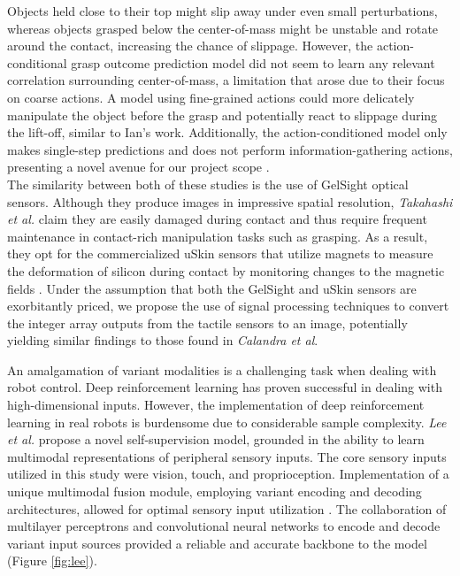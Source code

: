 \documentclass[11.5pt]{article}
\begin{document}
Objects held close to their top might slip away under even small perturbations, whereas objects grasped below the center-of-mass might be unstable and rotate around the contact, increasing the chance of slippage. However, the action-conditional grasp outcome prediction model did not seem to learn any relevant correlation surrounding center-of-mass, a limitation that arose due to their focus on coarse actions. A model using fine-grained actions could more delicately manipulate the object before the grasp and potentially react to slippage during the lift-off, similar to Ian's work.  Additionally, the action-conditioned model only makes single-step predictions and does not perform information-gathering actions, presenting a novel avenue for our project scope \cite{Calandra2018-zy}.\\

The similarity between both of these studies is the use of GelSight optical sensors. Although they produce images in impressive spatial resolution, \textit{Takahashi et al.} claim they are easily damaged during contact and thus require frequent maintenance in contact-rich manipulation tasks such as grasping. As a result, they opt for the commercialized uSkin sensors that utilize magnets to measure the deformation of silicon during contact by monitoring changes to the magnetic fields \cite{Takahashi2018-yg}. Under the assumption that both the GelSight and uSkin sensors are exorbitantly priced, we propose the use of signal processing techniques to convert the integer array outputs from the tactile sensors to an image, potentially yielding similar findings to those found in \textit{Calandra et al}.\\

\newpage

An amalgamation of variant modalities is a challenging task when dealing with robot control. Deep reinforcement learning has proven successful in dealing with high-dimensional inputs. However, the implementation of deep reinforcement learning in real robots is burdensome due to considerable sample complexity. \textit{Lee et al.} propose a novel self-supervision model, grounded in the ability to learn multimodal representations of peripheral sensory inputs. The core sensory inputs utilized in this study were vision, touch, and proprioception. Implementation of a unique multimodal fusion module, employing variant encoding and decoding architectures, allowed for optimal sensory input utilization \cite{Lee2018-gm}. The collaboration of multilayer perceptrons and convolutional neural networks to encode and decode variant input sources provided a reliable and accurate backbone to the model (Figure \ref{fig:lee}).
\end{document}
